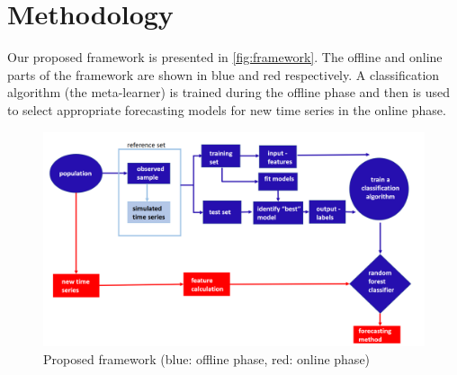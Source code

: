 \documentclass[11pt,a4paper,]{article}
\theoremstyle{definition}
\theoremstyle{definition}
\theoremstyle{definition}
\theoremstyle{remark}
\begin{document}
\section{Methodology}\label{methodology}

Our proposed framework is presented in \autoref{fig:framework}. The
offline and online parts of the framework are shown in blue and red
respectively. A classification algorithm (the meta-learner) is trained
during the offline phase and then is used to select appropriate
forecasting models for new time series in the online phase.

\begin{figure}

{\centering \includegraphics[width=\textwidth]{figures/framework} 

}

\caption{Proposed framework (blue: offline phase, red: online phase)}\label{fig:framework}
\end{figure}
\end{document}
